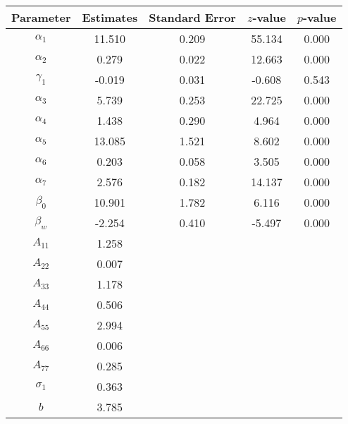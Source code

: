 \begin{table}[ht]
\centering
\begin{tabular}{ccccc}
  \hline
Parameter & Estimates & Standard Error & $z$-value & $p$-value \\ 
  \hline
$\alpha_1$ & 11.510 & 0.209 & 55.134 & 0.000 \\ 
  $\alpha_2$ & 0.279 & 0.022 & 12.663 & 0.000 \\ 
  $\gamma_1$ & -0.019 & 0.031 & -0.608 & 0.543 \\ 
  $\alpha_3$ & 5.739 & 0.253 & 22.725 & 0.000 \\ 
  $\alpha_4$ & 1.438 & 0.290 & 4.964 & 0.000 \\ 
  $\alpha_5$ & 13.085 & 1.521 & 8.602 & 0.000 \\ 
  $\alpha_6$ & 0.203 & 0.058 & 3.505 & 0.000 \\ 
  $\alpha_7$ & 2.576 & 0.182 & 14.137 & 0.000 \\ 
  $\beta_0$ & 10.901 & 1.782 & 6.116 & 0.000 \\ 
  $\beta_w$ & -2.254 & 0.410 & -5.497 & 0.000 \\ 
  $A_{11}$ & 1.258 &  &  &  \\ 
  $A_{22}$ & 0.007 &  &  &  \\ 
  $A_{33}$ & 1.178 &  &  &  \\ 
  $A_{44}$ & 0.506 &  &  &  \\ 
  $A_{55}$ & 2.994 &  &  &  \\ 
  $A_{66}$ & 0.006 &  &  &  \\ 
  $A_{77}$ & 0.285 &  &  &  \\ 
  $\sigma_1$ & 0.363 &  &  &  \\ 
  $b$ & 3.785 &  &  &  \\ 
   \hline
\end{tabular}
\end{table}
